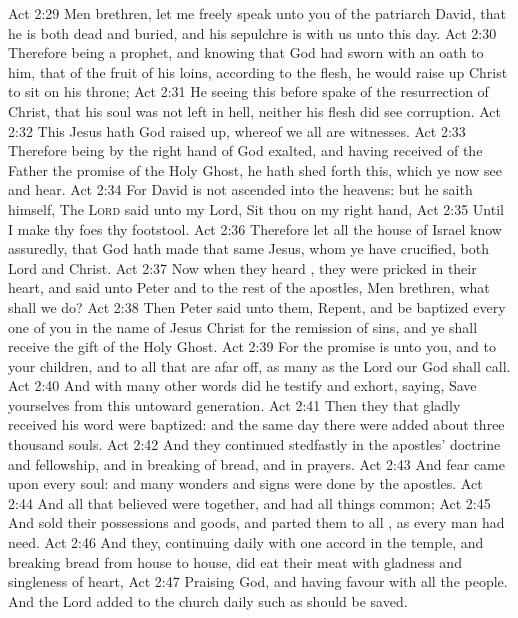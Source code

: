 \vs Act 2:29 Men  brethren, let me freely speak unto you of the patriarch David, that he is both dead and buried, and his sepulchre is with us unto this day.
\vs Act 2:30 Therefore being a prophet, and knowing that God had sworn with an oath to him, that of the fruit of his loins, according to the flesh, he would raise up Christ to sit on his throne;
\vs Act 2:31 He seeing this before spake of the resurrection of Christ, that his soul was not left in hell, neither his flesh did see corruption.
\vs Act 2:32 This Jesus hath God raised up, whereof we all are witnesses.
\vs Act 2:33 Therefore being by the right hand of God exalted, and having received of the Father the promise of the Holy Ghost, he hath shed forth this, which ye now see and hear.
\vs Act 2:34 For David is not ascended into the heavens: but he saith himself, The \textsc{Lord} said unto my Lord, Sit thou on my right hand,
\vs Act 2:35 Until I make thy foes thy footstool.
\vs Act 2:36 Therefore let all the house of Israel know assuredly, that God hath made that same Jesus, whom ye have crucified, both Lord and Christ.
\vs Act 2:37 Now when they heard , they were pricked in their heart, and said unto Peter and to the rest of the apostles, Men  brethren, what shall we do?
\vs Act 2:38 Then Peter said unto them, Repent, and be baptized every one of you in the name of Jesus Christ for the remission of sins, and ye shall receive the gift of the Holy Ghost.
\vs Act 2:39 For the promise is unto you, and to your children, and to all that are afar off,  as many as the Lord our God shall call.
\vs Act 2:40 And with many other words did he testify and exhort, saying, Save yourselves from this untoward generation.
\vs Act 2:41 Then they that gladly received his word were baptized: and the same day there were added  about three thousand souls.
\vs Act 2:42 And they continued stedfastly in the apostles' doctrine and fellowship, and in breaking of bread, and in prayers.
\vs Act 2:43 And fear came upon every soul: and many wonders and signs were done by the apostles.
\vs Act 2:44 And all that believed were together, and had all things common;
\vs Act 2:45 And sold their possessions and goods, and parted them to all , as every man had need.
\vs Act 2:46 And they, continuing daily with one accord in the temple, and breaking bread from house to house, did eat their meat with gladness and singleness of heart,
\vs Act 2:47 Praising God, and having favour with all the people. And the Lord added to the church daily such as should be saved.
